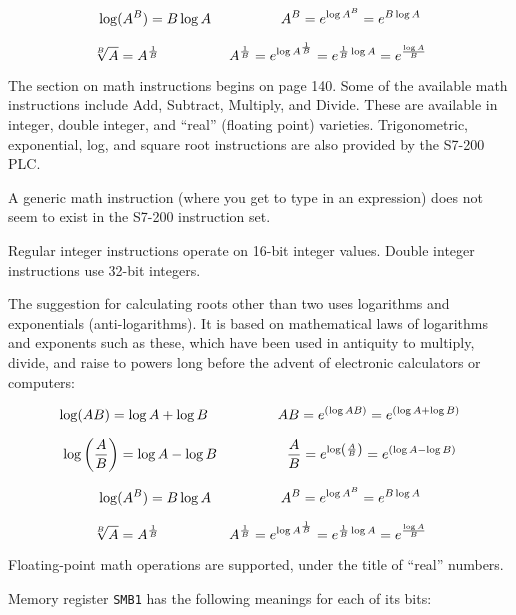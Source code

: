$$\log (A^B)= B \log A \hskip 50pt A^B = e^{\log A^B} = e^{B \log A}$$

$$\root B \of {A} = A^{1 \over B} \hskip 50pt A^{1 \over B} = e^{\log A^{1 \over B}} = e^{{1 \over B} \log A} = e^{{\log A} \over B}$$







The section on math instructions begins on page 140.  Some of the available math instructions include Add, Subtract, Multiply, and Divide.  These are available in integer, double integer, and ``real'' (floating point) varieties.  Trigonometric, exponential, log, and square root instructions are also provided by the S7-200 PLC.

\vskip 10pt

A generic math instruction (where you get to type in an expression) does not seem to exist in the S7-200 instruction set.

\vskip 10pt

Regular integer instructions operate on 16-bit integer values.  Double integer instructions use 32-bit integers.

\vskip 10pt

The suggestion for calculating roots other than two uses logarithms and exponentials (anti-logarithms).  It is based on mathematical laws of logarithms and exponents such as these, which have been used in antiquity to multiply, divide, and raise to powers long before the advent of electronic calculators or computers:

$$\log (AB) = \log A + \log B \hskip 50pt AB = e^{(\log AB)} = e^{(\log A + \log B)}$$

$$\log \left(A \over B \right) = \log A - \log B \hskip 50pt {A \over B} = e^{\log \left(A \over B \right)} = e^{(\log A - \log B)} $$

$$\log (A^B)= B \log A \hskip 50pt A^B = e^{\log A^B} = e^{B \log A}$$

$$\root B \of {A} = A^{1 \over B} \hskip 50pt A^{1 \over B} = e^{\log A^{1 \over B}} = e^{{1 \over B} \log A} = e^{{\log A} \over B}$$

\vskip 10pt

Floating-point math operations are supported, under the title of ``real'' numbers.

\vskip 10pt

Memory register {\tt SMB1} has the following meanings for each of its bits:


